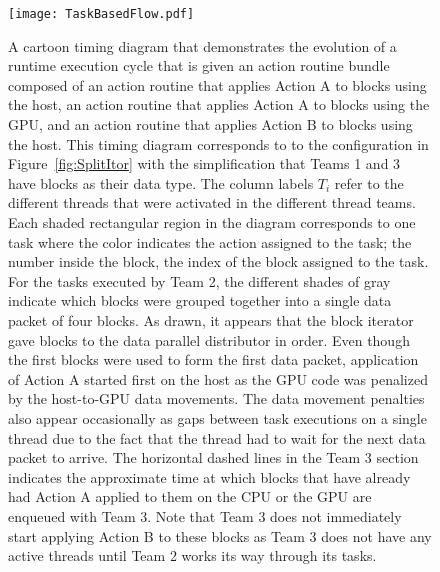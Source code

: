 \documentclass{article}
\begin{document}
\begin{figure}[!hp]
\begin{center}
\texttt{[image: TaskBasedFlow.pdf]}
\caption[]{A cartoon timing diagram that demonstrates the evolution of a runtime
execution cycle that is given an action routine bundle composed of an action
routine that applies Action A to blocks using the host, an action routine that
applies Action A to blocks using the GPU, and an action routine that applies
Action B to blocks using the host.  This timing diagram corresponds to
to the configuration in Figure~\ref{fig:SplitItor} with the simplification that
Teams 1 and 3 have blocks as their data type.  The column labels $T_i$ refer to
the different threads that were activated in the different thread teams.  Each shaded
rectangular region in the diagram corresponds to one task where the color
indicates the action assigned to the task; the number inside the block, the
index of the block assigned to the task.  For the tasks executed by Team 2, the
different shades of gray indicate which blocks were grouped together into a
single data packet of four blocks.  As drawn, it appears that the block
iterator gave blocks to the data parallel distributor in order.  Even though the
first blocks were used to form the first data packet, application of Action A
started first on the host as the GPU code was penalized by the host-to-GPU data
movements.  The data movement penalties also appear occasionally as gaps between
task executions on a single thread due to the fact that the thread had to wait
for the next data packet to arrive.  The horizontal dashed lines in the Team 3
section indicates the approximate time at which blocks that have already had
Action A applied to them on the CPU or the GPU are enqueued with Team 3.  Note
that Team 3 does not immediately start applying Action B to these blocks as
Team 3 does not have any active threads until Team 2 works its way through its
tasks.}
\label{fig:TaskBasedFlow}
\end{center}
\end{figure}
\end{document}
